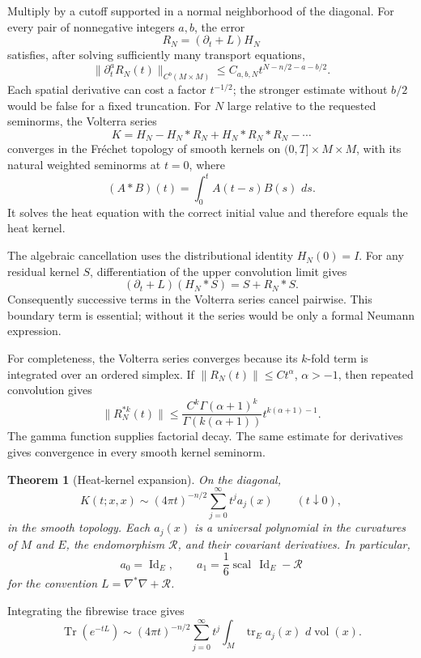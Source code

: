 \documentclass[11pt,oneside,reqno]{book}
\DeclareMathOperator{\Tr}{Tr}
\newcommand{\dd}{\,d}
\theoremstyle{plain}
\newtheorem{theorem}{Theorem}[chapter]
\theoremstyle{definition}
\theoremstyle{remark}
\begin{document}
Multiply by a cutoff supported in a normal neighborhood of the diagonal.
For every pair of nonnegative integers \(a,b\), the error
\[
 R_N=(\partial_t+L)H_N
\]
satisfies, after solving sufficiently many transport equations,
\[
 \lVert\partial_t^aR_N(t)\rVert_{C^b(M\times M)}
 \leq C_{a,b,N}t^{N-n/2-a-b/2}.
\]
Each spatial derivative can cost a factor \(t^{-1/2}\); the stronger
estimate without \(b/2\) would be false for a fixed truncation.  For \(N\)
large relative to the requested seminorms, the Volterra series
\[
 K
 =
 H_N-H_N*R_N+H_N*R_N*R_N-\cdots
\]
converges in the Fr\'echet topology of smooth kernels on
\((0,T]\times M\times M\), with its natural weighted seminorms at
\(t=0\), where
\[
 (A*B)(t)=\int_0^tA(t-s)B(s)\,\dd s.
\]
It solves the heat equation with the correct initial value and therefore
equals the heat kernel.

The algebraic cancellation uses the distributional identity \(H_N(0)=I\).
For any residual kernel \(S\), differentiation of the upper convolution
limit gives
\[
 (\partial_t+L)(H_N*S)=S+R_N*S.
\]
Consequently successive terms in the Volterra series cancel pairwise.
This boundary term is essential; without it the series would be only a
formal Neumann expression.

For completeness, the Volterra series converges because its \(k\)-fold
term is integrated over an ordered simplex. If
\(\|R_N(t)\|\leq Ct^\alpha\), \(\alpha>-1\), then repeated convolution
gives
\[
 \|R_N^{*k}(t)\|
 \leq
 \frac{C^k\Gamma(\alpha+1)^k}
      {\Gamma(k(\alpha+1))}
 t^{k(\alpha+1)-1}.
\]
The gamma function supplies factorial decay. The same estimate for
derivatives gives convergence in every smooth kernel seminorm.

\begin{theorem}[Heat-kernel expansion]\label{thm:heat-expansion}
On the diagonal,
\[
 K(t;x,x)
 \sim
 (4\pi t)^{-n/2}
 \sum_{j=0}^\infty t^j a_j(x)
 \qquad(t\downarrow0),
\]
in the smooth topology. Each \(a_j(x)\) is a universal polynomial in the
curvatures of \(M\) and \(E\), the endomorphism \(\mathcal R\), and their
covariant derivatives. In particular,
\[
 a_0=\operatorname{Id}_E,\qquad
 a_1=\frac16\operatorname{scal}\,\operatorname{Id}_E-\mathcal R
\]
for the convention \(L=\nabla^*\nabla+\mathcal R\).
\end{theorem}

Integrating the fibrewise trace gives
\[
 \Tr(e^{-tL})
 \sim
 (4\pi t)^{-n/2}
 \sum_{j=0}^\infty t^j
 \int_M\operatorname{tr}_Ea_j(x)\,\dd\operatorname{vol}(x).
\]
\end{document}
